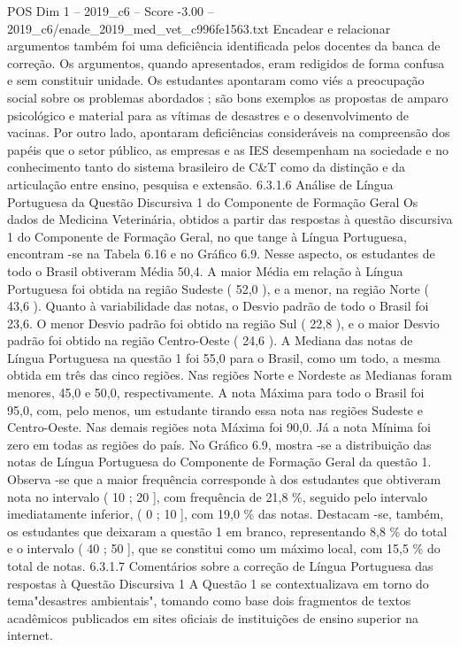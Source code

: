 \begin{textsample}{POS Dim 1 – 2019\_c6 – Score -3.00 – 2019\_c6/enade\_2019\_med\_vet\_c996fe1563.txt}
Encadear e relacionar argumentos também foi uma deficiência identificada pelos docentes da banca de correção.
Os argumentos, quando apresentados, eram redigidos de forma confusa e sem constituir unidade.
Os estudantes apontaram como viés a preocupação social sobre os problemas abordados ; são bons exemplos as propostas de amparo psicológico e material para as vítimas de desastres e o desenvolvimento de vacinas.
Por outro lado, apontaram deficiências consideráveis na compreensão dos papéis que o setor público, as empresas e as IES desempenham na sociedade e no conhecimento tanto do sistema brasileiro de C\&T como da distinção e da articulação entre ensino, pesquisa e extensão. 6.3.1.6 Análise de Língua Portuguesa da Questão Discursiva 1 do Componente de Formação Geral Os dados de Medicina Veterinária, obtidos a partir das respostas à questão discursiva 1 do Componente de Formação Geral, no que tange à Língua Portuguesa, encontram -se na Tabela 6.16 e no Gráfico 6.9.
Nesse aspecto, os estudantes de todo o Brasil obtiveram Média 50,4.
A maior Média em relação à Língua Portuguesa foi obtida na região Sudeste ( 52,0 ), e a menor, na região Norte ( 43,6 ).
Quanto à variabilidade das notas, o Desvio padrão de todo o Brasil foi 23,6.
O menor Desvio padrão foi obtido na região Sul ( 22,8 ), e o maior Desvio padrão foi obtido na região Centro-Oeste ( 24,6 ).
A Mediana das notas de Língua Portuguesa na questão 1 foi 55,0 para o Brasil, como um todo, a mesma obtida em três das cinco regiões.
Nas regiões Norte e Nordeste as Medianas foram menores, 45,0 e 50,0, respectivamente.
A nota Máxima para todo o Brasil foi 95,0, com, pelo menos, um estudante tirando essa nota nas regiões Sudeste e Centro-Oeste.
Nas demais regiões nota Máxima foi 90,0.
Já a nota Mínima foi zero em todas as regiões do país.
No Gráfico 6.9, mostra -se a distribuição das notas de Língua Portuguesa do Componente de Formação Geral da questão 1.
Observa -se que a maior frequência corresponde à dos estudantes que obtiveram nota no intervalo ( 10 ; 20 ], com frequência de 21,8 \%, seguido pelo intervalo imediatamente inferior, ( 0 ; 10 ], com 19,0 \% das notas.
Destacam -se, também, os estudantes que deixaram a questão 1 em branco, representando 8,8 \% do total e o intervalo ( 40 ; 50 ], que se constitui como um máximo local, com 15,5 \% do total de notas. 6.3.1.7 Comentários sobre a correção de Língua Portuguesa das respostas à Questão Discursiva 1 A Questão 1 se contextualizava em torno do tema"desastres ambientais", tomando como base dois fragmentos de textos acadêmicos publicados em sites oficiais de instituições de ensino superior na internet.

\end{textsample}
